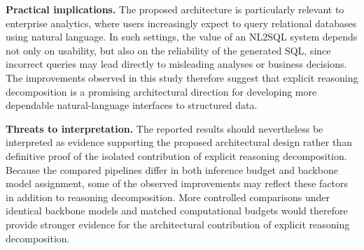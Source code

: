 \documentclass{svproc}
\begin{document}
\textbf{Practical implications.}
The proposed architecture is particularly relevant to enterprise analytics, where users increasingly expect to query relational databases using natural language. In such settings, the value of an NL2SQL system depends not only on usability, but also on the reliability of the generated SQL, since incorrect queries may lead directly to misleading analyses or business decisions. The improvements observed in this study therefore suggest that explicit reasoning decomposition is a promising architectural direction for developing more dependable natural-language interfaces to structured data.


\textbf{Threats to interpretation.}
The reported results should nevertheless be interpreted as evidence supporting the proposed architectural design rather than definitive proof of the isolated contribution of explicit reasoning decomposition. Because the compared pipelines differ in both inference budget and backbone model assignment, some of the observed improvements may reflect these factors in addition to reasoning decomposition. More controlled comparisons under identical backbone models and matched computational budgets would therefore provide stronger evidence for the architectural contribution of explicit reasoning decomposition.







\end{document}
